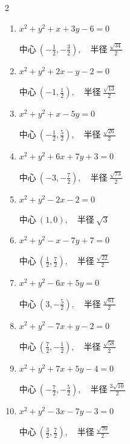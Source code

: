 \begin{multicols}{2}
\begin{enumerate}
        $\displaystyle 中心\: \left(-1,\frac{5}{2}\right), \quad 半径 \ \frac{\sqrt{21}}{2}$

  \item $x^{2}+y^{2}+x+3y-6=0$

        $\displaystyle 中心\: \left(-\frac{1}{2},-\frac{3}{2}\right), \quad 半径 \ \frac{\sqrt{34}}{2}$

  \item $x^{2}+y^{2}+2x-y-2=0$

        $\displaystyle 中心\: \left(-1,\frac{1}{2}\right), \quad 半径 \ \frac{\sqrt{13}}{2}$

  \item $x^{2}+y^{2}+x-5y=0$

        $\displaystyle 中心\: \left(-\frac{1}{2},\frac{5}{2}\right), \quad 半径 \ \frac{\sqrt{26}}{2}$

  \item $x^{2}+y^{2}+6x+7y+3=0$

        $\displaystyle 中心\: \left(-3,-\frac{7}{2}\right), \quad 半径 \ \frac{\sqrt{73}}{2}$

  \item $x^{2}+y^{2}-2x-2=0$

        $\displaystyle 中心\: \left(1,0\right), \quad 半径 \ \sqrt{3}$

  \item $x^{2}+y^{2}-x-7y+7=0$

        $\displaystyle 中心\: \left(\frac{1}{2},\frac{7}{2}\right), \quad 半径 \ \frac{\sqrt{22}}{2}$

  \item $x^{2}+y^{2}-6x+5y=0$

        $\displaystyle 中心\: \left(3,-\frac{5}{2}\right), \quad 半径 \ \frac{\sqrt{61}}{2}$

  \item $x^{2}+y^{2}-7x+y-2=0$

        $\displaystyle 中心\: \left(\frac{7}{2},-\frac{1}{2}\right), \quad 半径 \ \frac{\sqrt{58}}{2}$

  \item $x^{2}+y^{2}+7x+5y-4=0$

        $\displaystyle 中心\: \left(-\frac{7}{2},-\frac{5}{2}\right), \quad 半径 \ \frac{3\sqrt{10}}{2}$

  \item $x^{2}+y^{2}-3x-7y-3=0$

        $\displaystyle 中心\: \left(\frac{3}{2},\frac{7}{2}\right), \quad 半径 \ \frac{\sqrt{70}}{2}$


\end{enumerate}
\end{multicols}
